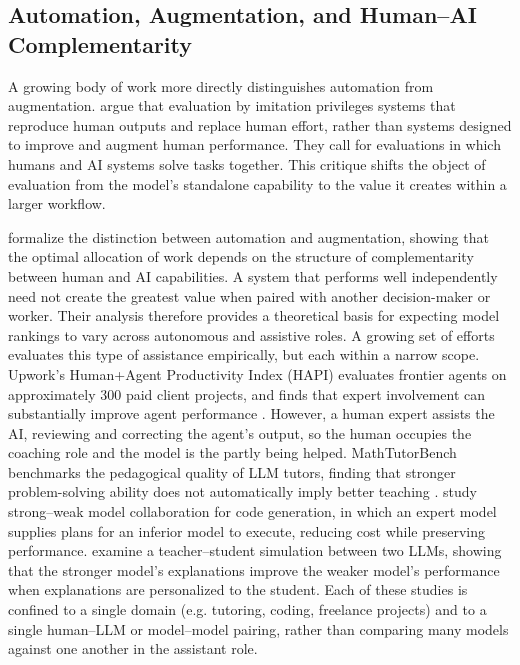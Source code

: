 \subsection{Automation, Augmentation, and Human--AI Complementarity}

A growing body of work more directly distinguishes automation from augmentation. \citet{haupt2025} argue that evaluation by imitation privileges systems that reproduce human outputs and replace human effort, rather than systems designed to improve and augment human performance. They call for evaluations in which humans and AI systems solve tasks together. This critique shifts the object of evaluation from the model's standalone capability to the value it creates within a larger workflow.

\citet{fugener2026} formalize the distinction between automation and augmentation, showing that the optimal allocation of work depends on the structure of complementarity between human and AI capabilities. A system that performs well independently need not create the greatest value when paired with another decision-maker or worker. Their analysis therefore provides a theoretical basis for expecting model rankings to vary across autonomous and assistive roles. A growing set of efforts evaluates this type of assistance empirically, but each within a narrow scope. Upwork's Human+Agent Productivity Index (HAPI) evaluates frontier agents on approximately 300 paid client projects, and finds that expert involvement can substantially improve agent performance \citep{upwork_hapi2025}. However, a human expert assists the AI, reviewing and correcting the agent's output, so the human occupies the coaching role and the model is the partly being helped. MathTutorBench benchmarks the pedagogical quality of LLM tutors, finding that stronger problem-solving ability does not automatically imply better teaching \citep{macina2025}. \citet{gandhi2025} study strong--weak model collaboration for code generation, in which an expert model supplies plans for an inferior model to execute, reducing cost while preserving performance. \citet{saha2023} examine a teacher--student simulation between two LLMs, showing that the stronger model's explanations improve the weaker model's performance when explanations are personalized to the student. Each of these studies is confined to a single domain (e.g. tutoring, coding, freelance projects) and to a single human--LLM or model--model pairing, rather than comparing many models against one another in the assistant role.

